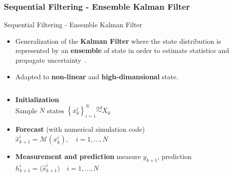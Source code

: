 \documentclass[aspectratio=169]{beamer} %
\begin{document}
\subsubsection{Sequential Filtering - Ensemble Kalman Filter}
\begin{frame}{Sequential Filtering - Ensemble Kalman Filter}
    \begin{exampleblock}{}
        \begin{itemize}
            \item Generalization of the \textbf{Kalman Filter} where the state distribution is represented by an \textbf{ensemble} of state in order to estimate statistics and propagate uncertainty~\cite{evensen_sequential_1994}.
            \item Adapted to \textbf{non-linear} and \textbf{high-dimansional} state.
        \end{itemize}
    \end{exampleblock}
    \begin{columns}
        \begin{column}{0.6\textwidth}
            \begin{itemize}
                \item<1-> \textbf{Initialization} \\
                    Sample $N$ states $\left\{x^i_0\right\}_{i=1}^N \stackrel{iid}{\sim} X_0$
                \item<2-> \textbf{Forecast} (with numerical simulation code) \\
                    $\hat x^i_{k+1} = \mathcal M(x_{k}^i), \quad i = 1, \dots, N$
                \item<3-> \textbf{Measurement and prediction}
                    measure $y_{k+1}$, prediction $h^i_{k+1} = \mathcal (\hat x_{k+1}^i) \quad i = 1, \dots, N$


\end{itemize}
\end{column}
\end{columns}
\end{frame}
\end{document}
